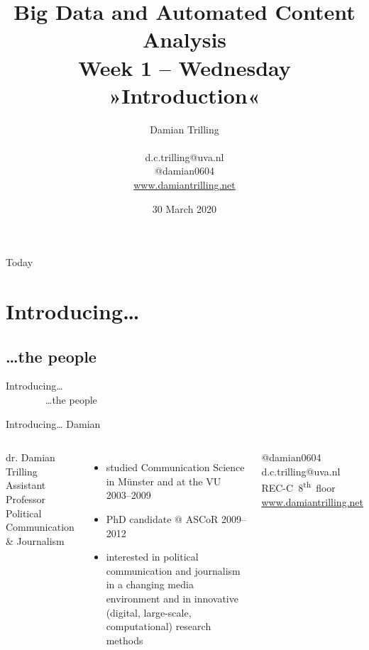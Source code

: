 \documentclass{beamer}
\begin{document}
\title[Big Data and Automated Content Analysis]{\textbf{Big Data and Automated Content Analysis} \\ Week 1 -- Wednesday \\ »Introduction«}
\author[Damian Trilling]{Damian Trilling \\ ~ \\ \footnotesize{d.c.trilling@uva.nl \\@damian0604} \\ \url{www.damiantrilling.net}}
\date{30 March 2020}


\begin{frame}{}
\titlepage
\end{frame}

\begin{frame}{Today}
\tableofcontents
\end{frame}



\section{Introducing\ldots}
\subsection{\ldots the people}

\begin{frame}
	Introducing\ldots \\
	~~~~~~~~\ldots the people
\end{frame}

\begin{frame}{Introducing\ldots}
	{\huge{Damian}}
	\small{}
	\begin{columns}
		dr. Damian Trilling \\
		Assistant Professor Political Communication \& Journalism \\
		\begin{itemize}
			\item studied Communication Science in M\"unster and at the VU 2003--2009
			\item PhD candidate @ ASCoR 2009--2012
			\item interested in political communication and journalism in a changing media environment and in innovative (digital, large-scale, computational) research methods
		\end{itemize}
		@damian0604 ~~ d.c.trilling@uva.nl ~~ REC-C~8\textsuperscript{th}~floor ~~ \url{www.damiantrilling.net} 
	\end{columns}
\end{frame}
\end{document}
